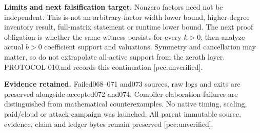 \documentclass[10pt]{article}
\begin{document}
\textbf{Limits and next falsification target.} Nonzero factors need not be
independent. This is not an arbitrary-factor width lower bound, higher-degree
inventory result, full-matrix statement or runtime lower bound. The next
proof obligation is whether the same witness persists for every $k>0$;
then analyze actual $b>0$ coefficient support and valuations. Symmetry and
cancellation may matter, so do not extrapolate all-active support from the
zeroth layer. PROTOCOL-010.md records this continuation [pcc:unverified].

\textbf{Evidence retained.} Failed068--071 and073 sources, raw logs and exits
are preserved alongside accepted072 and074. Compiler elaboration failures
are distinguished from mathematical counterexamples. No native timing,
scaling, paid/cloud or attack campaign was launched. All parent immutable
source, evidence, claim and ledger bytes remain preserved [pcc:unverified].
\end{document}
